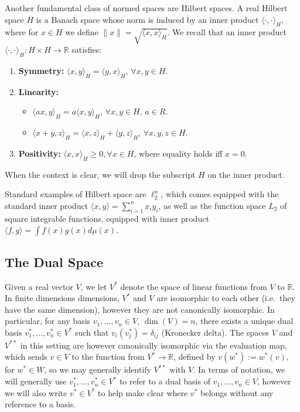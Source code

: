 \documentclass[11pt]{article}
\theoremstyle{plain}
\theoremstyle{plain}
\newcommand{\R}{\ensuremath{\mathbb{R}}}
\newcommand{\pr}[2]{\langle{#1, #2}\rangle}
\begin{document}
Another fundamental class of normed spaces are Hilbert spaces. A real Hilbert space
$H$ is a Banach space whose norm is induced by an inner product
$\pr{\cdot}{\cdot}_H$, where for $x \in H$ we define $\|x\| = \sqrt{\pr{x}{x}_H}$.
We recall that an inner product $\pr{\cdot}{\cdot}_H: H
\times H \rightarrow \R$ satisfies:
\begin{enumerate}
\item {\bf Symmetry:} $\pr{x}{y}_H = \pr{y}{x}_H$, $\forall x,y \in H$. 
\item {\bf Linearity:} 
   \begin{itemize} 
   \item $\pr{a x}{y}_H = a \pr{x}{y}_H$, $\forall x,y \in H$, $a \in R$.
   \item $\pr{x+y}{z}_H = \pr{x}{z}_H + \pr{y}{z}_H$, $\forall x,y,z \in H$.
   \end{itemize}
\item {\bf Positivity:} $\pr{x}{x}_H \geq 0, \forall x \in H$, where equality
holds iff $x = 0$.
\end{enumerate}
When the context is clear, we will drop the subscript $H$ on the inner product.

Standard examples of Hilbert space are $\ell_2^n$, which comes equipped with the
standard inner product $\pr{x}{y} = \sum_{i=1}^n x_i y_i$, as well as the
function space $L_2$ of square integrable functions, equipped with inner product
$\pr{f}{g} = \int f(x) g(x) d\mu(x)$.  

\subsection{The Dual Space} 
Given a real vector $V$, we let $V^*$ denote the space of linear functions from
$V$ to $\R$. In finite dimensions dimensions, $V^*$ and $V$ are isomorphic to
each other (i.e.~they have the same dimension), however they are not canonically
isomorphic. In particular, for any basis $v_1,\dots,v_n \in V$, $\dim(V)=n$,
there exists a unique dual basis $v_1^*,\dots,v_n^* \in V^*$ such that
$v_i(v_j^*) = \delta_{ij}$ (Kronecker delta). The spaces $V$ and $V^{**}$ in
this setting are however canonically isomorphic via the evaluation map, which
sends $v \in V$ to the function from $V^* \rightarrow \R$, defined by $v(w^*) :=
w^*(v)$, for $w^* \in W$, so we may generally identify $V^{**}$ with $V$. In
terms of notation, we will generally use $v_1^*,\dots,v_n^* \in V^*$ to refer to
a dual basis of $v_1,\dots,v_n \in V$, however we will also write $v^* \in V^*$
to help make clear where $v^*$ belongs without any reference to a basis. 
\end{document}
